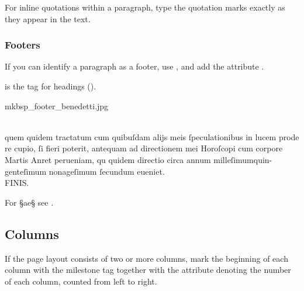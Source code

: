 \begin{note}
For inline quotations within a paragraph, type the quotation marks exactly as they appear in the text.
\end{note}

\subsubsection{Footers}
\label{footers}

\begin{mainruleLessImportant}
If you can identify a paragraph as a footer, use , and add the attribute .
\end{mainruleLessImportant}

\begin{crossref}
 is the tag for headings ().
\end{crossref}

\begin{sampleImage}{mkbsp_footer_benedetti.jpg}
\begin{typeLatin}
 \someText \\
quem quidem tractatum cum quibuſdam alijs meis ſpeculationibus in lucem prode \\
re cupio, ſi fieri poterit, antequam ad directionem mei Horoſcopi cum corpore \\
Martis Anret perueniam, qu quidem directio circa annum milleſimum\lwr quin- \\
genteſimum nonageſimum ſecundum eueniet.\\
FINIS.
\end{typeLatin}

\end{sampleImage}

\begin{crossref}
For §{ae}§ see .
\end{crossref}

\tocspace
\subsection{Columns}
\label{section columns}
\begin{mainrule}
If the page layout consists of two or more columns, mark the beginning of each column with the milestone tag  together with the attribute  denoting the number of each column, counted from left to right.
\end{mainrule}

